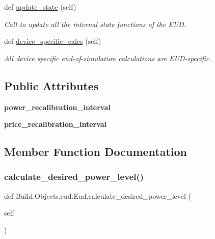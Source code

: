 \begin{DoxyCompactItemize}
def \hyperlink{class_build_1_1_objects_1_1eud_1_1_eud_ac807e57f20360c9e828046a38aaa7db6}{update\+\_\+state} (self)
\begin{DoxyCompactList}\small\item\em Call to update all the internal state functions of the E\+UD. \end{DoxyCompactList}\item 
def \hyperlink{class_build_1_1_objects_1_1eud_1_1_eud_a4d6c3c842206a1738efd24319ddc2176}{device\+\_\+specific\+\_\+calcs} (self)
\begin{DoxyCompactList}\small\item\em All device specific end-\/of-\/simulation calculations are E\+U\+D-\/specific. \end{DoxyCompactList}\end{DoxyCompactItemize}
\subsection*{Public Attributes}
\begin{DoxyCompactItemize}
\item 
\mbox{\label{class_build_1_1_objects_1_1eud_1_1_eud_a79c2171714e8f604f2cf6e1b245dcf9f}} 
{\bfseries power\+\_\+recalibration\+\_\+interval}
\item 
\mbox{\label{class_build_1_1_objects_1_1eud_1_1_eud_ad35f5cbe19da59af227b7a38c4b76ae9}} 
{\bfseries price\+\_\+recalibration\+\_\+interval}
\end{DoxyCompactItemize}


\subsection{Member Function Documentation}
\mbox{\label{class_build_1_1_objects_1_1eud_1_1_eud_a690ec54ec92b3d2373858fe460013730}} 
\subsubsection{\texorpdfstring{calculate\+\_\+desired\+\_\+power\+\_\+level()}{calculate\_desired\_power\_level()}}
{\footnotesize\ttfamily def Build.\+Objects.\+eud.\+Eud.\+calculate\+\_\+desired\+\_\+power\+\_\+level (\begin{DoxyParamCaption}\item[{}]{self }\end{DoxyParamCaption})}




